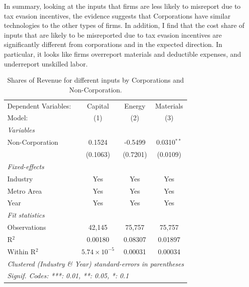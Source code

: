 \documentclass[
  12pt]{article}
\theoremstyle{definition}
\theoremstyle{remark}
\begin{document}
In summary, looking at the inputs that firms are less likely to
misreport due to tax evasion incentives, the evidence suggests that
Corporations have similar technologies to the other types of firms. In
addition, I find that the cost share of inputs that are likely to be
misreported due to tax evasion incentives are significantly different
from corporations and in the expected direction. In particular, it looks
like firms overreport materials and deductible expenses, and underreport
unskilled labor.

\begin{table}

\caption{\label{tbl-reg-shares}Shares of Revenue for different inputs by
Corporations and Non-Corporation.}

\begin{minipage}{\linewidth}

\begingroup
\centering
\begin{tabular}{lccc}
   \tabularnewline \midrule \midrule
   Dependent Variables: & Capital               & Energy   & Materials\\  
   Model:               & (1)                   & (2)      & (3)\\  
   \midrule
   \emph{Variables}\\
   Non-Corporation      & 0.1524                & -0.5499  & 0.0310$^{**}$\\   
                        & (0.1063)              & (0.7201) & (0.0109)\\   
   \midrule
   \emph{Fixed-effects}\\
   Industry             & Yes                   & Yes      & Yes\\  
   Metro Area           & Yes                   & Yes      & Yes\\  
   Year                 & Yes                   & Yes      & Yes\\  
   \midrule
   \emph{Fit statistics}\\
   Observations         & 42,145                & 75,757   & 75,757\\  
   R$^2$                & 0.00180               & 0.08307  & 0.01897\\  
   Within R$^2$         & $5.74\times 10^{-5}$  & 0.00031  & 0.00034\\  
   \midrule \midrule
   \multicolumn{4}{l}{\emph{Clustered (Industry \& Year) standard-errors in parentheses}}\\
   \multicolumn{4}{l}{\emph{Signif. Codes: ***: 0.01, **: 0.05, *: 0.1}}\\
\end{tabular}
\par\endgroup

\end{minipage}%

\end{table}%
\end{document}
